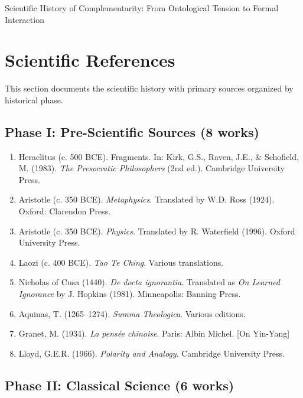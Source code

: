 \begin{chapter}{Scientific History of Complementarity: From Ontological Tension to Formal Interaction}
\section{Scientific References}

\nocite{bcm_master}

\label{sec:references}

This section documents the scientific history with primary sources organized by historical phase.

\subsection{Phase I: Pre-Scientific Sources (8 works)}

\begin{enumerate}
    \item Heraclitus (c. 500 BCE). Fragments. In: Kirk, G.S., Raven, J.E., \& Schofield, M. (1983). \textit{The Presocratic Philosophers} (2nd ed.). Cambridge University Press.

    \item Aristotle (c. 350 BCE). \textit{Metaphysics}. Translated by W.D. Ross (1924). Oxford: Clarendon Press.

    \item Aristotle (c. 350 BCE). \textit{Physics}. Translated by R. Waterfield (1996). Oxford University Press.

    \item Laozi (c. 400 BCE). \textit{Tao Te Ching}. Various translations.

    \item Nicholas of Cusa (1440). \textit{De docta ignorantia}. Translated as \textit{On Learned Ignorance} by J. Hopkins (1981). Minneapolis: Banning Press.

    \item Aquinas, T. (1265--1274). \textit{Summa Theologica}. Various editions.

    \item Granet, M. (1934). \textit{La pensée chinoise}. Paris: Albin Michel. [On Yin-Yang]

    \item Lloyd, G.E.R. (1966). \textit{Polarity and Analogy}. Cambridge University Press.
\end{enumerate}

\subsection{Phase II: Classical Science (6 works)}


\end{chapter}
